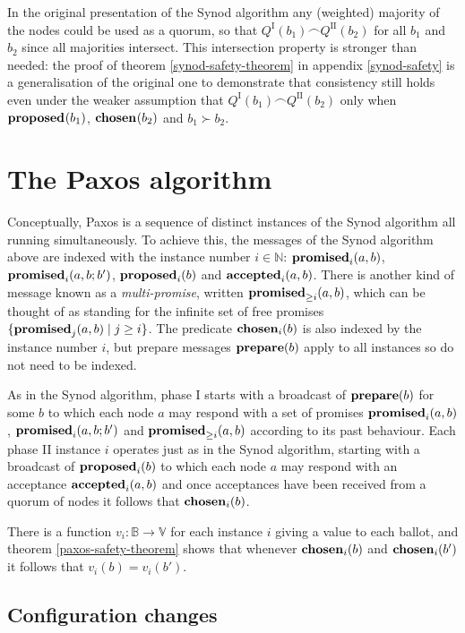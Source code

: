 \documentclass[journal]{IEEEtran}
\begin{document}
In the original presentation of the Synod algorithm any (weighted) majority of
the nodes could be used as a quorum, so that $Q^\textrm{I}(b_1) \frown
Q^\textrm{II}(b_2)$ for all $b_1$ and $b_2$ since all majorities intersect.
This intersection property is stronger than needed: the proof of theorem
\ref{synod-safety-theorem} in appendix \ref{synod-safety} is a generalisation
of the original one to demonstrate that consistency still holds even under the
weaker assumption that $Q^\textrm{I}(b_1) \frown Q^\textrm{II}(b_2)$ only when
$\mathbf{proposed}_{}(b_1)$, $\mathbf{chosen}_{}(b_2)$ and $b_1 \succ b_2$.

\section{The Paxos algorithm}

Conceptually, Paxos is a sequence of distinct instances of the Synod algorithm
all running simultaneously. To achieve this, the messages of the Synod
algorithm above are indexed with the instance number $i \in \mathbb N$:
$\mathbf{promised}_{i}(a,b)$, $\mathbf{promised}_{i}(a,b;b')$, $\mathbf{proposed}_{i}(b)$ and $\mathbf{accepted}_{i}(a,b)$.
There is another kind of message known as a \textit{multi-promise}, written
$\mathbf{promised}_{\ge i}(a,b)$, which can be thought of as standing for the infinite set of
free promises ${\{ \mathbf{promised}_{j}(a,b) \mid j \ge i \}}$. The predicate
$\mathbf{chosen}_{i}(b)$ is also indexed by the instance number $i$, but prepare
messages $\mathbf{prepare}(b)$ apply to all instances so do not need to be indexed.

As in the Synod algorithm, phase I starts with a broadcast of $\mathbf{prepare}(b)$ for
some $b$ to which each node $a$ may respond with a set of promises
$\mathbf{promised}_{i}(a,b)$, $\mathbf{promised}_{i}(a,b;b')$ and $\mathbf{promised}_{\ge i}(a,b)$ according to its
past behaviour. Each phase II instance $i$ operates just as in the Synod
algorithm, starting with a broadcast of $\mathbf{proposed}_{i}(b)$ to which each node $a$
may respond with an acceptance $\mathbf{accepted}_{i}(a,b)$ and once acceptances have been
received from a quorum of nodes it follows that $\mathbf{chosen}_{i}(b)$.

There is a function $v_i : \mathbb B \to \mathbb V$ for each instance $i$
giving a value to each ballot, and theorem \ref{paxos-safety-theorem} shows
that whenever $\mathbf{chosen}_{i}(b)$ and $\mathbf{chosen}_{i}(b')$ it follows that $v_i(b) =
v_i(b')$.

\subsection{Configuration changes}\label{configuration-changes}
\end{document}
